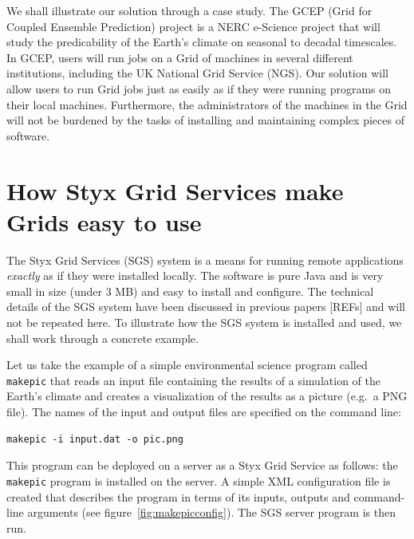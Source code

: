\documentclass[a4paper]{article}
\begin{document}
\begin{multicols}{2}
We shall illustrate our solution through a case study.  The GCEP (Grid for Coupled Ensemble Prediction) project is a NERC e-Science project that will study the predicability of the Earth's climate on seasonal to decadal timescales.  In GCEP, users will run jobs on a Grid of machines in several different institutions, including the UK National Grid Service (NGS).  Our solution will allow users to run Grid jobs just as easily as if they were running programs on their local machines.  Furthermore, the administrators of the machines in the Grid will not be burdened by the tasks of installing and maintaining complex pieces of software.


\section{How Styx Grid Services make Grids easy to use}
The Styx Grid Services (SGS) system is a means for running remote applications {\em exactly\/} as if they were installed locally.  The software is pure Java and is very small in size (under 3 MB) and easy to install and configure.  The technical details of the SGS system have been discussed in previous papers [REFs] and will not be repeated here.  To illustrate how the SGS system is installed and used, we shall work through a concrete example.

Let us take the example of a simple environmental science program called {\tt makepic} that reads an input file containing the results of a simulation of the Earth's climate and creates a visualization of the results as a picture (e.g.\ a PNG file).  The names of the input and output files are specified on the command line:

\begin{verbatim}
makepic -i input.dat -o pic.png
\end{verbatim}

This program can be deployed on a server as a Styx Grid Service as follows: the {\tt makepic} program is installed on the server.  A simple XML configuration file is created that describes the program in terms of its inputs, outputs and command-line arguments (see figure~\ref{fig:makepicconfig}).  The SGS server program is then run.


\end{multicols}
\end{document}
